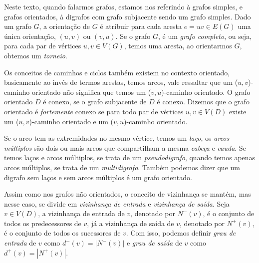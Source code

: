 Neste texto, quando falarmos grafos, estamos nos referindo à grafos simples, e grafos orientados, à digrafos com grafo subjacente sendo um grafo simples. Dado um grafo $G$, a orientação de $G$ é atribuir para cada aresta $e=uv \in E(G)$ uma única orientação, $(u,v)$ ou $(v,u)$. Se o grafo $G$, é um \emph{grafo completo}, ou seja, para cada par de vértices $u,v \in V(G)$, temos uma aresta, ao orientarmos $G$, obtemos um \emph{torneio}.

Os conceitos de caminhos e ciclos também existem no contexto orientado, basicamente ao invés de termos arestas, temos arcos, vale ressaltar que um ($u,v$)-caminho orientado não significa que temos um ($v,u$)-caminho orientado. O grafo orientado $D$ é conexo, se o grafo subjacente de $D$ é conexo. Dizemos que o grafo orientado é \emph{fortemente} conexo se para todo par de vértices $u,v \in V(D)$ existe um ($u,v$)-caminho orientado e um ($v,u$)-caminho orientado.

Se o arco tem as extremidades no mesmo vértice, temos um \emph{laço}, os \emph{arcos múltiplos} são dois ou mais arcos que compartilham a mesma \emph{cabeça} e \emph{cauda}. Se temos laços e arcos múltiplos, se trata de um \emph{pseudodigrafo}, quando temos apenas arcos múltiplos, se trata de um \emph{multidigrafo}. Também podemos dizer que um digrafo sem laços e sem arcos múltiplos é um grafo orientado.

Assim como nos grafos não orientados, o conceito de vizinhança se mantém, mas nesse caso, se divide em \emph{vizinhança de entrada} e \emph{vizinhança de saída}. Seja $v \in V(D)$, a vizinhança de entrada de $v$, denotado por $N^-(v)$, é o conjunto de todos os predecessores de $v$, já a vizinhança de saída de $v$, denotado por $N^+(v)$, é o conjunto de todos os sucessores de $v$. Com isso, podemos definir \emph{grau de entrada} de $v$ como $d^-(v) = |N^-(v)|$ e \emph{grau de saída} de $v$ como $d^+(v)=|N^+(v)|$.

